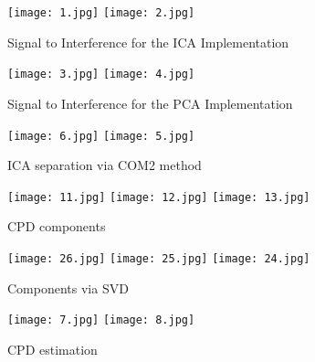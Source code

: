 \begin{figure}[!htbp]
%
\centering
\texttt{[image: 1.jpg]}
\label{a1}
\endminipage\hfill
{}%
\centering
\texttt{[image: 2.jpg]}
\label{a2}
\endminipage\hfill
\caption{Signal to Interference for the ICA Implementation}
\end{figure}



\begin{figure}[!htbp]
%
\centering
\texttt{[image: 3.jpg]}
\label{a3}
\endminipage\hfill
{}%
\centering
\texttt{[image: 4.jpg]}
\label{a4}
\endminipage\hfill
\caption{Signal to Interference for the PCA Implementation}
\end{figure}


\begin{figure}[!htbp]
%
\centering
\texttt{[image: 6.jpg]}
\label{a9}
\endminipage\hfill
{}%
\centering
\texttt{[image: 5.jpg]}
\label{a10}
\endminipage\hfill
\caption{ICA separation via COM2 method}
\end{figure}



\begin{figure}[!htbp]
%
\centering
\texttt{[image: 11.jpg]}
\endminipage\hfill
{}%
\centering
\texttt{[image: 12.jpg]}
\endminipage\hfill
{}%
\centering
\texttt{[image: 13.jpg]}
\endminipage\hfill
\caption{CPD components}\label{a15}
\end{figure}

\begin{figure}[!htbp]
%
\centering
\texttt{[image: 26.jpg]}
\endminipage\hfill
{}%
\centering
\texttt{[image: 25.jpg]}
\endminipage\hfill
{}%
\centering
\texttt{[image: 24.jpg]}
\endminipage\hfill
\caption{Components via SVD}\label{A1}
\end{figure}


\begin{figure}[!htbp]
%
\centering
\texttt{[image: 7.jpg]}
\label{a13}
\endminipage\hfill
{}%
\centering
\texttt{[image: 8.jpg]}
\label{a14}
\endminipage\hfill
\caption{CPD estimation}
\end{figure}




